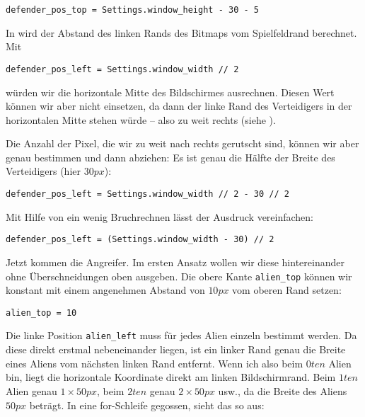 \lstset{firstnumber=24}
\begin{lstlisting}
defender_pos_top = Settings.window_height - 30 - 5
\end{lstlisting}

In  wird der Abstand des linken Rands des Bitmaps vom Spielfeldrand berechnet. Mit

\lstset{firstnumber=23}
\begin{lstlisting}
defender_pos_left = Settings.window_width // 2
\end{lstlisting}

würden wir die horizontale Mitte des Bildschirmes ausrechnen. Diesen Wert können wir aber nicht einsetzen, da dann der linke Rand des Verteidigers in der horizontalen Mitte stehen würde -- also zu weit rechts (siehe ). 


Die Anzahl der Pixel, die wir zu weit nach rechts gerutscht sind, können wir aber genau bestimmen und dann abziehen: Es ist genau die Hälfte der Breite des Verteidigers (hier $30px$):
\begin{lstlisting}
defender_pos_left = Settings.window_width // 2 - 30 // 2
\end{lstlisting}

Mit Hilfe von ein wenig Bruchrechnen lässt der Ausdruck vereinfachen:
\begin{lstlisting}
defender_pos_left = (Settings.window_width - 30) // 2
\end{lstlisting}

Jetzt kommen die Angreifer. Im ersten Ansatz wollen wir diese hintereinander ohne Überschneidungen oben ausgeben. Die obere Kante \texttt{alien\_top} können wir konstant mit einem angenehmen Abstand von $10px$ vom oberen Rand setzen:

\lstset{firstnumber=44}
\begin{lstlisting}
alien_top = 10 
\end{lstlisting}

Die linke Position \texttt{alien\_left} muss für jedes Alien einzeln bestimmt werden. Da diese direkt erstmal nebeneinander liegen, ist ein linker Rand genau die Breite eines Aliens vom nächsten linken Rand entfernt. Wenn ich also beim $0ten$ Alien bin, liegt die horizontale Koordinate direkt am linken Bildschirmrand. Beim $1ten$ Alien genau $1\times50px$, beim $2ten$ genau $2\times50px$ usw., da die Breite des Aliens $50px$ beträgt. In eine for-Schleife gegossen, sieht das so aus:

